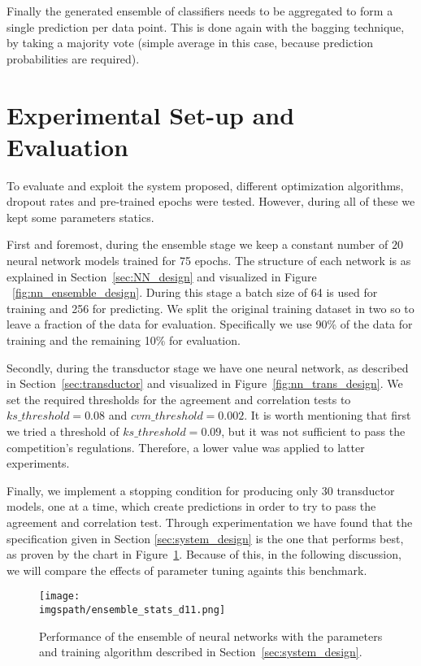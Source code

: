 \documentclass[conference]{IEEEtran}
\def\imgspath{./imgs}
\def\imgspath{../imgs}
\begin{document}
Finally the generated ensemble of classifiers needs to be aggregated to form a
single prediction per data point. This is done again with the bagging technique,
by taking a majority vote (simple average in this case, because prediction
probabilities are required).

\section{Experimental Set-up and Evaluation}
\label{sec:experiment}
To evaluate and exploit the system proposed, different optimization algorithms,
dropout rates and pre-trained epochs were tested. However, during all of these
we kept some parameters statics.

First and foremost, during the ensemble stage we keep a constant number of $20$
neural network models trained for 75 epochs. The structure of each network is as
explained in Section~\ref{sec:NN_design} and visualized in Figure
~\ref{fig:nn_ensemble_design}. During this stage a batch size of 64 is used for
training and 256 for predicting. We split the original training dataset in two
so to leave a fraction of the data for evaluation. Specifically we use 90\% of
the data for training and the remaining 10\% for evaluation.

Secondly, during the transductor stage we have one neural network, as described
in Section~\ref{sec:transductor} and visualized in
Figure~\ref{fig:nn_trans_design}. We set the required thresholds for the
agreement and correlation tests to $ks\_threshold = 0.08$ and $cvm\_threshold =
0.002$. It is worth mentioning that first we tried a threshold of $ks\_threshold =
0.09$, but it was not sufficient to pass the competition's regulations.
Therefore, a lower value was applied to latter experiments.

Finally, we implement a stopping condition for producing only $30$ transductor
models, one at a time, which create predictions in order to try to pass the
agreement and correlation test. Through experimentation we have found that the
specification given in Section \ref{sec:system_design} is the one that performs
best, as proven by the chart in Figure~\ref{fig:ensemble_d11}. Because of this,
in the following discussion, we will compare the effects of parameter tuning
againts this benchmark.


\begin{figure}[!ht]
	\centering
	\texttt{[image: \\imgspath/ensemble\_stats\_d11.png]}
	\caption{Performance of the ensemble of neural networks with the parameters
	and training algorithm described in Section~\ref{sec:system_design}.}
	\label{fig:ensemble_d11}
\end{figure}
\end{document}
